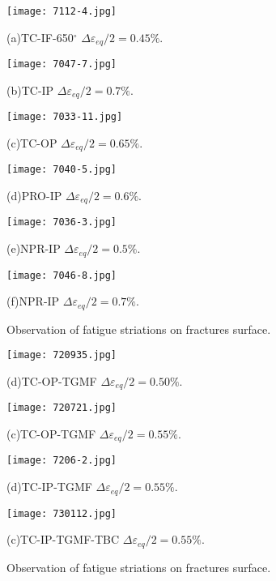 \begin{figure}
  \begin{minipage}[t]{0.5\linewidth}
  \nonumber
    \centering
    \texttt{[image: 7112-4.jpg]}
    \centerline{(a)TC-IF-650$^{\circ}$ $\Delta \varepsilon_{eq}/2=0.45\%$.}
  \end{minipage}%
  \begin{minipage}[t]{0.5\linewidth}
    \centering
    \texttt{[image: 7047-7.jpg]}
    \centerline{(b)TC-IP $\Delta \varepsilon_{eq}/2=0.7\%$.}
  \end{minipage}
  
  \begin{minipage}[t]{0.5\linewidth}
  \nonumber
    \centering
    \texttt{[image: 7033-11.jpg]}
    \centerline{(c)TC-OP $\Delta \varepsilon_{eq}/2=0.65\%$.}
  \end{minipage}%
  \begin{minipage}[t]{0.5\linewidth}
    \centering
    \texttt{[image: 7040-5.jpg]}
    \centerline{(d)PRO-IP $\Delta \varepsilon_{eq}/2=0.6\%$.}
  \end{minipage}

  \begin{minipage}[t]{0.5\linewidth}
    \centering
    \texttt{[image: 7036-3.jpg]}
    \centerline{(e)NPR-IP $\Delta \varepsilon_{eq}/2=0.5\%$.}
  \end{minipage}%
  \begin{minipage}[t]{0.5\linewidth}
    \centering
    \texttt{[image: 7046-8.jpg]}
    \centerline{(f)NPR-IP $\Delta \varepsilon_{eq}/2=0.7\%$.}
  \end{minipage}
  \caption{Observation of fatigue striations on fractures surface.}
  \label{Fig:MicrostructureofInconel718}
\end{figure}

\begin{figure}
  \begin{minipage}[t]{0.5\linewidth}
  \nonumber
    \centering
    \texttt{[image: 720935.jpg]}
    \centerline{(d)TC-OP-TGMF $\Delta \varepsilon_{eq}/2=0.50\%$.}
  \end{minipage}%
  \begin{minipage}[t]{0.5\linewidth}
    \centering
    \texttt{[image: 720721.jpg]}
    \centerline{(c)TC-OP-TGMF $\Delta \varepsilon_{eq}/2=0.55\%$.}
  \end{minipage}

  \begin{minipage}[t]{0.5\linewidth}
  \nonumber
    \centering
    \texttt{[image: 7206-2.jpg]}
    \centerline{(d)TC-IP-TGMF $\Delta \varepsilon_{eq}/2=0.55\%$.}
  \end{minipage}%
  \begin{minipage}[t]{0.5\linewidth}
    \centering
    \texttt{[image: 730112.jpg]}
    \centerline{(c)TC-IP-TGMF-TBC $\Delta \varepsilon_{eq}/2=0.55\%$.}
  \end{minipage}

  \caption{Observation of fatigue striations on fractures surface.}
  \label{Fig:MicrostructureofInconel718}
\end{figure}


